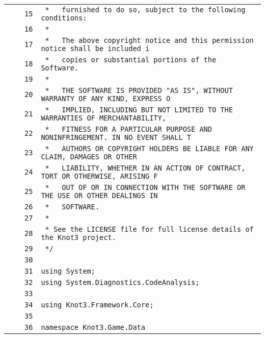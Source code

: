\documentclass[a4paper,10pt]{article}
\begin{document}
\begin{longtable}[l]{lrrl}
\cellcolor{gray} &  & \verb~15~ & \verb~ *   furnished to do so, subject to the following conditions:~\\
\cellcolor{gray} &  & \verb~16~ & \verb~ *~\\
\cellcolor{gray} &  & \verb~17~ & \verb~ *   The above copyright notice and this permission notice shall be included i~\\
\cellcolor{gray} &  & \verb~18~ & \verb~ *   copies or substantial portions of the Software.~\\
\cellcolor{gray} &  & \verb~19~ & \verb~ *~\\
\cellcolor{gray} &  & \verb~20~ & \verb~ *   THE SOFTWARE IS PROVIDED "AS IS", WITHOUT WARRANTY OF ANY KIND, EXPRESS O~\\
\cellcolor{gray} &  & \verb~21~ & \verb~ *   IMPLIED, INCLUDING BUT NOT LIMITED TO THE WARRANTIES OF MERCHANTABILITY,~\\
\cellcolor{gray} &  & \verb~22~ & \verb~ *   FITNESS FOR A PARTICULAR PURPOSE AND NONINFRINGEMENT. IN NO EVENT SHALL T~\\
\cellcolor{gray} &  & \verb~23~ & \verb~ *   AUTHORS OR COPYRIGHT HOLDERS BE LIABLE FOR ANY CLAIM, DAMAGES OR OTHER~\\
\cellcolor{gray} &  & \verb~24~ & \verb~ *   LIABILITY, WHETHER IN AN ACTION OF CONTRACT, TORT OR OTHERWISE, ARISING F~\\
\cellcolor{gray} &  & \verb~25~ & \verb~ *   OUT OF OR IN CONNECTION WITH THE SOFTWARE OR THE USE OR OTHER DEALINGS IN~\\
\cellcolor{gray} &  & \verb~26~ & \verb~ *   SOFTWARE.~\\
\cellcolor{gray} &  & \verb~27~ & \verb~ *~\\
\cellcolor{gray} &  & \verb~28~ & \verb~ * See the LICENSE file for full license details of the Knot3 project.~\\
\cellcolor{gray} &  & \verb~29~ & \verb~ */~\\
\cellcolor{gray} &  & \verb~30~ & \verb~~\\
\cellcolor{gray} &  & \verb~31~ & \verb~using System;~\\
\cellcolor{gray} &  & \verb~32~ & \verb~using System.Diagnostics.CodeAnalysis;~\\
\cellcolor{gray} &  & \verb~33~ & \verb~~\\
\cellcolor{gray} &  & \verb~34~ & \verb~using Knot3.Framework.Core;~\\
\cellcolor{gray} &  & \verb~35~ & \verb~~\\
\cellcolor{gray} &  & \verb~36~ & \verb~namespace Knot3.Game.Data~\\

\end{longtable}
\end{document}
